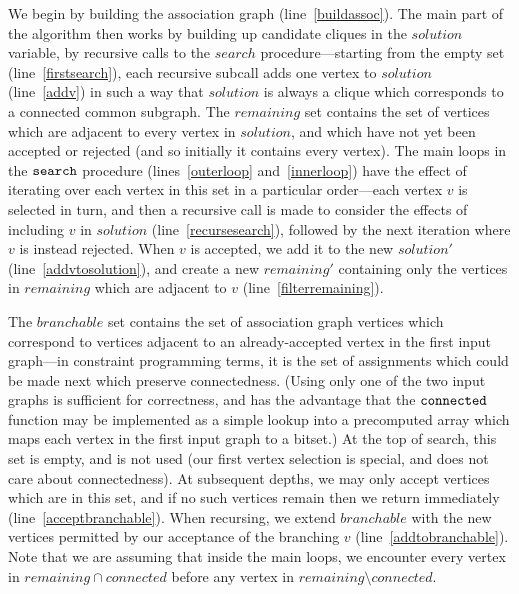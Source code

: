 \documentclass{llncs}
\newcommand{\lineref}[1]{line~\ref{#1}}
\newcommand{\twolinesref}[2]{lines~\ref{#1} and~\ref{#2}}
\begin{document}
We begin by building the association graph (\lineref{buildassoc}). The main part of the algorithm
then works by building up candidate cliques in the $\mathit{solution}$ variable, by recursive calls
to the $\mathit{search}$ procedure---starting from the empty set (\lineref{firstsearch}), each
recursive subcall adds one vertex to $\mathit{solution}$ (\lineref{addv}) in such a way that
$\mathit{solution}$ is always a clique which corresponds to a connected common subgraph. The
$\mathit{remaining}$ set contains the set of vertices which are adjacent to every vertex in
$\mathit{solution}$, and which have not yet been accepted or rejected (and so initially it contains
every vertex). The main loops in the $\FuncSty{search}$ procedure
(\twolinesref{outerloop}{innerloop}) have the effect of iterating over each vertex in this set in a
particular order---each vertex $v$ is selected in turn, and then a recursive call is made to
consider the effects of including $v$ in $\mathit{solution}$ (\lineref{recursesearch}), followed by
the next iteration where $v$ is instead rejected. When $v$ is accepted, we add it to the new
$\mathit{solution'}$ (\lineref{addvtosolution}), and create a new $\mathit{remaining'}$ containing
only the vertices in $\mathit{remaining}$ which are adjacent to $v$ (\lineref{filterremaining}).

The $\mathit{branchable}$ set contains the set of association graph vertices which correspond to
vertices adjacent to an already-accepted vertex in the first input graph---in constraint programming terms, it is the
set of assignments which could be made next which preserve connectedness. (Using only one of the two
input graphs is sufficient for correctness, and has the advantage that the $\FuncSty{connected}$
function may be implemented as a simple lookup into a precomputed array which maps each vertex in
the first input graph to a bitset.) At the top of search, this set is empty, and is not used (our
first vertex selection is special, and does not care about connectedness). At subsequent depths, we
may only accept vertices which are in this set, and if no such vertices remain then we return
immediately (\lineref{acceptbranchable}). When recursing, we extend $\mathit{branchable}$ with the
new vertices permitted by our acceptance of the branching $v$ (\lineref{addtobranchable}). Note that
we are assuming that inside the main loops, we encounter every vertex in $\mathit{remaining} \cap
\mathit{connected}$ before any vertex in $\mathit{remaining} \setminus \mathit{connected}$.
\end{document}
